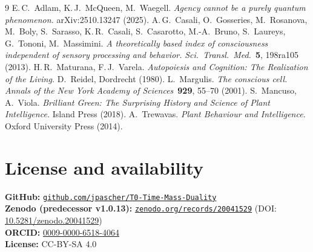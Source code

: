 \begin{thebibliography}{9}
 E.\,C.~Adlam, K.\,J.~McQueen, M.~Waegell. \emph{Agency cannot be a purely quantum phenomenon.} arXiv:2510.13247 (2025).
 A.\,G.~Casali, O.~Gosseries, M.~Rosanova, M.~Boly, S.~Sarasso, K.\,R.~Casali, S.~Casarotto, M.-A.~Bruno, S.~Laureys, G.~Tononi, M.~Massimini. \emph{A theoretically based index of consciousness independent of sensory processing and behavior.} \emph{Sci.\ Transl.\ Med.}\ \textbf{5}, 198ra105 (2013).
 H.\,R.~Maturana, F.\,J.~Varela. \emph{Autopoiesis and Cognition: The Realization of the Living.} D.~Reidel, Dordrecht (1980).
 L.~Margulis. \emph{The conscious cell.} \emph{Annals of the New York Academy of Sciences}\ \textbf{929}, 55--70 (2001).
 S.~Mancuso, A.~Viola. \emph{Brilliant Green: The Surprising History and Science of Plant Intelligence.} Island Press (2018).
 A.~Trewavas. \emph{Plant Behaviour and Intelligence.} Oxford University Press (2014).
\end{thebibliography}

\section*{License and availability}

\textbf{GitHub:} \href{https://github.com/jpascher/T0-Time-Mass-Duality}{\texttt{github.com/jpascher/T0-Time-Mass-Duality}}\\
\textbf{Zenodo (predecessor v1.0.13):} \href{https://zenodo.org/records/20041529}{\texttt{zenodo.org/records/20041529}} (DOI: \href{https://doi.org/10.5281/zenodo.20041529}{10.5281/zenodo.20041529})\\
\textbf{ORCID:} \href{https://orcid.org/0009-0000-6518-4064}{0009-0000-6518-4064}\\
\textbf{License:} CC-BY-SA 4.0
